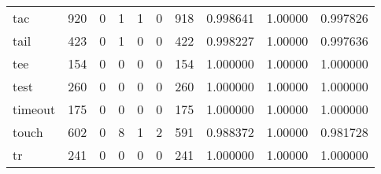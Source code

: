 \begin{tabular}{lrrrrrrrrr}
tac       &                    920 &                                  0 &                                 1 &                                1 &                                 0 &                             918 &                                0.998641 &                                1.00000 &                             0.997826 \\
tail      &                    423 &                                  0 &                                 1 &                                0 &                                 0 &                             422 &                                0.998227 &                                1.00000 &                             0.997636 \\
tee       &                    154 &                                  0 &                                 0 &                                0 &                                 0 &                             154 &                                1.000000 &                                1.00000 &                             1.000000 \\
test      &                    260 &                                  0 &                                 0 &                                0 &                                 0 &                             260 &                                1.000000 &                                1.00000 &                             1.000000 \\
timeout   &                    175 &                                  0 &                                 0 &                                0 &                                 0 &                             175 &                                1.000000 &                                1.00000 &                             1.000000 \\
touch     &                    602 &                                  0 &                                 8 &                                1 &                                 2 &                             591 &                                0.988372 &                                1.00000 &                             0.981728 \\
tr        &                    241 &                                  0 &                                 0 &                                0 &                                 0 &                             241 &                                1.000000 &                                1.00000 &                             1.000000 \\

\end{tabular}
